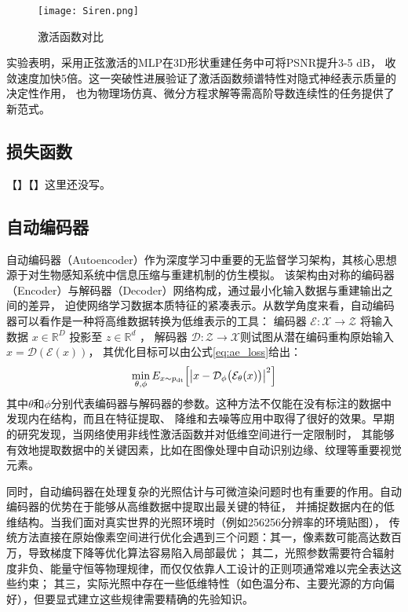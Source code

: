 \begin{figure}[htb]
  \centering
  \texttt{[image: Siren.png]}
  \caption{激活函数对比\cite{sitzmann2020implicit}}
  \label{fig:siren_compare}
\end{figure}

实验\cite{sitzmann2020implicit}表明，采用正弦激活的MLP在3D形状重建任务中可将PSNR提升3-5 dB，
收敛速度加快5倍。这一突破性进展验证了激活函数频谱特性对隐式神经表示质量的决定性作用，
也为物理场仿真、微分方程求解等需高阶导数连续性的任务提供了新范式。

\subsection{损失函数}
【】【】这里还没写。

\subsection{自动编码器}
自动编码器（Autoencoder）作为深度学习中重要的无监督学习架构，其核心思想源于对生物感知系统中信息压缩与重建机制的仿生模拟。
该架构由对称的编码器（Encoder）与解码器（Decoder）网络构成，通过最小化输入数据与重建输出之间的差异，
迫使网络学习数据本质特征的紧凑表示。从数学角度来看，自动编码器可以看作是一种将高维数据转换为低维表示的工具：
编码器 $\mathcal{E}:\mathcal{X}\rightarrow\mathcal{Z}$ 将输入数据 $x\in\mathbb{R}^D$ 投影至 $z\in\mathbb{R}^d$ ，
解码器 $\mathcal{D}:\mathcal{Z}\rightarrow\mathcal{X}$则试图从潜在编码重构原始输入 $\hat{x}=\mathcal{D}\left(\mathcal{E}\left(x\right)\right)$，
其优化目标可以由公式\eqref{eq:ae_loss}给出：
\begin{equation}\label{eq:ae_loss}
\min_{\theta,\phi}E_{x\sim p_{\mathrm{dt}}}\Bigl[\bigl|x-\mathcal{D}_\phi\bigl(\mathcal{E}_\theta(x)\bigr)\bigr|^2\Bigr]
\end{equation}
其中$\theta$和$\phi$分别代表编码器与解码器的参数。这种方法不仅能在没有标注的数据中发现内在结构，而且在特征提取、
降维和去噪等应用中取得了很好的效果。早期的研究\cite{Hinton_2006}发现，当网络使用非线性激活函数并对低维空间进行一定限制时，
其能够有效地提取数据中的关键因素，比如在图像处理中自动识别边缘、纹理等重要视觉元素。

同时，自动编码器在处理复杂的光照估计与可微渲染问题时也有重要的作用。自动编码器的优势在于能够从高维数据中提取出最关键的特征，
并捕捉数据内在的低维结构。当我们面对真实世界的光照环境时（例如256\times256分辨率的环境贴图），
传统方法直接在原始像素空间进行优化会遇到三个问题：其一，像素数可能高达数百万，导致梯度下降等优化算法容易陷入局部最优；
其二，光照参数需要符合辐射度非负、能量守恒等物理规律，而仅仅依靠人工设计的正则项通常难以完全表达这些约束；
其三，实际光照中存在一些低维特性（如色温分布、主要光源的方向偏好），但要显式建立这些规律需要精确的先验知识。

